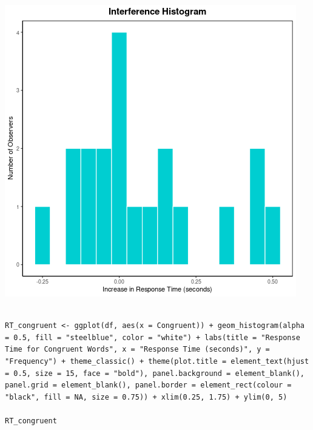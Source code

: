 \documentclass{article}
\begin{document}
\begin{center}
\includegraphics[width=.9\linewidth]{converted_stroop4.png}
\end{center}



\begin{verbatim}

RT_congruent <- ggplot(df, aes(x = Congruent)) + geom_histogram(alpha = 0.5, fill = "steelblue", color = "white") + labs(title = "Response Time for Congruent Words", x = "Response Time (seconds)", y = "Frequency") + theme_classic() + theme(plot.title = element_text(hjust = 0.5, size = 15, face = "bold"), panel.background = element_blank(), panel.grid = element_blank(), panel.border = element_rect(colour = "black", fill = NA, size = 0.75)) + xlim(0.25, 1.75) + ylim(0, 5)

RT_congruent

\end{verbatim}
\end{document}
